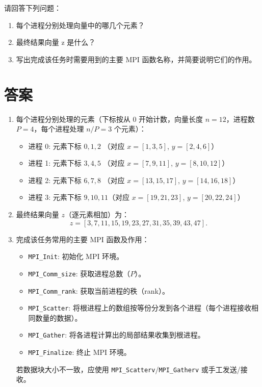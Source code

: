 请回答下列问题：
\begin{enumerate}
    \item 每个进程分别处理向量中的哪几个元素？
    \item 最终结果向量 z 是什么？
    \item 写出完成该任务时需要用到的主要 MPI 函数名称，并简要说明它们的作用。
\end{enumerate}

\section{答案}
\begin{enumerate}
    \item 每个进程分别处理的元素（下标按从 0 开始计数，向量长度 $n=12$，进程数 $P=4$，每个进程处理 $n/P=3$ 个元素）：
    \begin{itemize}
        \item 进程 0: 元素下标 $0,1,2$ （对应 $x=[1,3,5]$, $y=[2,4,6]$）
        \item 进程 1: 元素下标 $3,4,5$ （对应 $x=[7,9,11]$, $y=[8,10,12]$）
        \item 进程 2: 元素下标 $6,7,8$ （对应 $x=[13,15,17]$, $y=[14,16,18]$）
        \item 进程 3: 元素下标 $9,10,11$（对应 $x=[19,21,23]$, $y=[20,22,24]$）
    \end{itemize}

    \item 最终结果向量 $z$（逐元素相加）为：
    $$z=[3,7,11,15,19,23,27,31,35,39,43,47].$$

    \item 完成该任务常用的主要 MPI 函数及作用：
    \begin{itemize}
        \item \texttt{MPI\_Init}: 初始化 MPI 环境。
        \item \texttt{MPI\_Comm\_size}: 获取进程总数（$P$）。
        \item \texttt{MPI\_Comm\_rank}: 获取当前进程的秩（rank）。
        \item \texttt{MPI\_Scatter}: 将根进程上的数组按等份分发到各个进程（每个进程接收相同数量的数据）。
        \item \texttt{MPI\_Gather}: 将各进程计算出的局部结果收集到根进程。
        \item \texttt{MPI\_Finalize}: 终止 MPI 环境。
    \end{itemize}
若数据块大小不一致，应使用 \texttt{MPI\_Scatterv}/\texttt{MPI\_Gatherv} 或手工发送/接收。
\end{enumerate}

